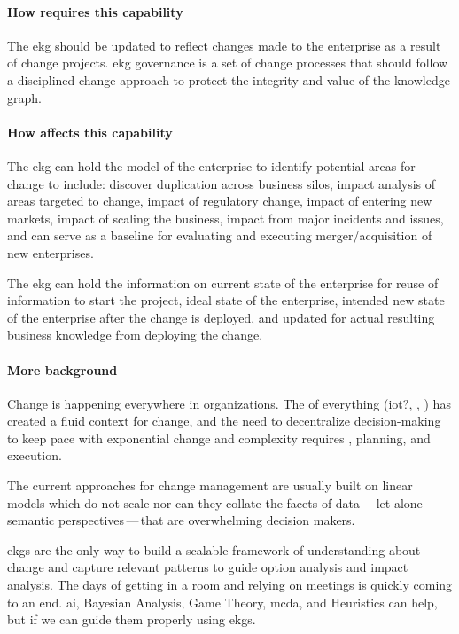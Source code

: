 %
%

\ekgmmContextSection

\paragraph*{How  requires this capability}
The \gls{ekg} should be updated to reflect changes made to the enterprise as a result of change projects.
\gls{ekg} governance is a set of change processes that should follow a
disciplined change approach to protect the integrity and value of the knowledge graph.

\paragraph*{How  affects this capability}

The \gls{ekg} can hold the model of the enterprise to identify potential areas for change to include:
discover duplication across business silos, impact analysis of areas targeted to change,
impact of regulatory change, impact of entering new markets, impact of scaling the business,
impact from major incidents and issues, and can serve as a baseline for evaluating and executing
merger/acquisition of new enterprises.

The \gls{ekg} can hold the information on current state of the enterprise for reuse of information to start the
project, ideal state of the enterprise, intended new state of the enterprise after the change is deployed,
and updated for actual resulting business knowledge from deploying the change.

\paragraph*{More background}
Change is happening everywhere in organizations.
The  of everything (\gls{iot}?, , )
has created a fluid context for change, and the need to decentralize decision-making to keep pace with
exponential change and complexity requires , planning, and execution.

The current approaches for change management are usually built on linear models which do not scale nor can they collate
the facets of data\,---\,let alone semantic perspectives\,---\,that are overwhelming decision makers.

\Glspl{ekg} are the only way to build a scalable framework of understanding about change and capture relevant patterns
to guide option analysis and impact analysis.
The days of getting in a room and relying on meetings is quickly coming to an end.
\Gls{ai}, Bayesian Analysis, Game Theory, \gls{mcda},
and Heuristics can help, but  if we can guide them properly using \glspl{ekg}.

